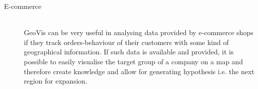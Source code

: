 \begin{description}
\item[E-commerce] \hfill \\
\ac{GeoVis} can be very useful in analysing data provided by e-commerce shops if they track orders-behaviour of their customers with some kind of geographical information. If such data is available and provided, it is possible to easily visualise the target group of a company on a map and therefore create knowledge and allow for generating hypothesis i.e. the next region for expansion.

\end{description}
